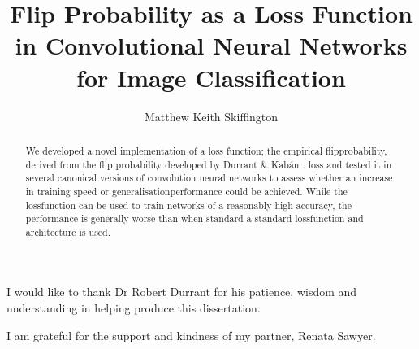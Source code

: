 \documentclass[12pt]{uwthesis17}
\title{Flip Probability as a Loss Function in Convolutional Neural Networks for Image Classification}
\author{Matthew Keith Skiffington}
\begin{document}
\maketitle
\setcounter{page}{2}

\setlength{\parindent}{0pt} %

\begin{abstract}

We developed a novel implementation of a \gls{loss} function; the empirical \gls{flipprobability}, derived from the flip probability developed by Durrant \& Kab\'an \cite{durrant2013sharp}. \gls{loss} and tested it in several canonical versions of convolution neural networks to assess whether an increase in training speed or \gls{generalisationperformance} could be achieved. While the \gls{lossfunction} can be used to train networks of a reasonably high accuracy, the performance is generally worse than when standard a standard \gls{lossfunction} and architecture is used. 

\end{abstract}
\begin{acknowledgements}

\bigskip

\begin{spacing}{2}

I would like to thank Dr Robert Durrant for his patience, wisdom and understanding in helping produce this dissertation.
\bigskip

I am grateful for the support and kindness of my partner, Renata Sawyer.
\bigskip

\end{spacing}

\end{acknowledgements}
\tableofcontents
\listoffigures
\listoftables
\newpage
{}
\setcounter{page}{1}








\end{document}

